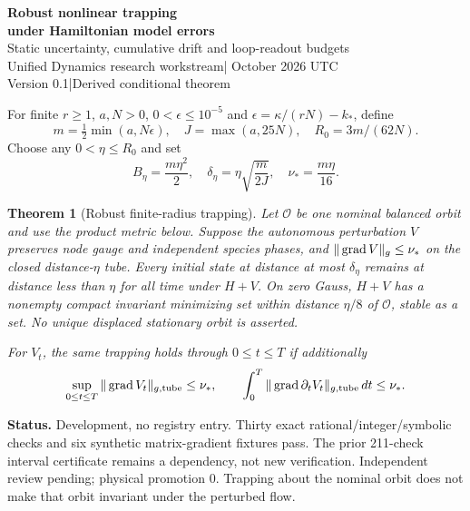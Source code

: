 \documentclass[11pt,a4paper]{article}
\newtheorem{theorem}{Theorem}\newtheorem{lemma}[theorem]{Lemma}
\begin{document}
\begin{center}
{\Large\bfseries Robust nonlinear trapping\\under Hamiltonian model errors}\\[10pt]
{\large Static uncertainty, cumulative drift and loop-readout budgets}\\[10pt]
Unified Dynamics research workstream\quad | October 2026 UTC\\
Version 0.1\quad |\quad Derived conditional theorem
\end{center}
\begin{abstract}
The explicit nonlinear energy-barrier certificate assumed the frozen Hamiltonian exactly. We derive sufficient robustness budgets for gauge- and species-phase invariant Hamiltonian errors, retaining the fixed equal norms and Gauss law. A small static gradient preserves all-time trapping about a selected nominal balanced orbit and yields a nearby compact invariant minimizing set. For time-dependent errors, a cumulative gradient-variation bound supplies a finite-horizon guarantee. A separate work estimate covers tangent external forcing. We translate the static gradient budget into kinetic, diamond, hopping and site-detuning errors, and transfer the state bound to complex loop readouts and the inherited real-channel classifier. An exact resonant oscillator shows why instantaneous smallness alone cannot support a general all-time conclusion for arbitrary drives. No laboratory calibration or physical correspondence is assumed.
\end{abstract}
For finite $r\ge1$, $a,N>0$, $0<\epsilon\le10^{-5}$ and $\epsilon=\kappa/(rN)-k_*$, define
\[
m=\tfrac12\min(a,N\epsilon),\quad J=\max(a,25N),\quad R_0=3m/(62N).
\]
Choose any $0<\eta\le R_0$ and set
\[
\boxed{B_\eta=\frac{m\eta^2}{2},\quad
\delta_\eta=\eta\sqrt{\frac m{2J}},\quad \nu_*=\frac{m\eta}{16}.}
\]
\begin{theorem}[Robust finite-radius trapping]\label{th:main}
Let $\mathcal O$ be one nominal balanced orbit and use the product metric below. Suppose the autonomous perturbation $V$ preserves node gauge and independent species phases, and $\|\operatorname{grad} V\|_g\le\nu_*$ on the closed distance-$\eta$ tube. Every initial state at distance at most $\delta_\eta$ remains at distance less than $\eta$ for all time under $H+V$. On zero Gauss, $H+V$ has a nonempty compact invariant minimizing set within distance $\eta/8$ of $\mathcal O$, stable as a set. No unique displaced stationary orbit is asserted.

For $V_t$, the same trapping holds through $0\le t\le T$ if additionally
\[
\sup_{0\le t\le T}\|\operatorname{grad} V_t\|_{g,\mathrm{tube}}\le\nu_*,
\qquad\int_0^T\|\operatorname{grad}\partial_tV_t\|_{g,\mathrm{tube}}\,dt\le\nu_*.
\]
\end{theorem}
\textbf{Status.} Development, no registry entry. Thirty exact rational/integer/symbolic checks and six synthetic matrix-gradient fixtures pass. The prior 211-check interval certificate remains a dependency, not new verification. Independent review pending; physical promotion $0$. Trapping about the nominal orbit does not make that orbit invariant under the perturbed flow.
\newpage
\end{document}
